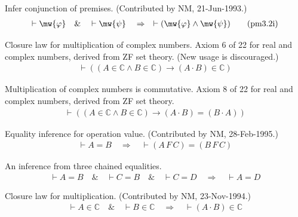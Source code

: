 \begin{lemma} Infer conjunction of premises.  (Contributed
by NM, 21-Jun-1993.)
\begin{align}
\vdash \mw{\varphi}\quad\&\quad \vdash \mw{\psi}\quad\Rightarrow\quad \vdash (
    \mw{\varphi} \wedge \mw{\psi} )\label{eq:pm3.2i}\tag{pm3.2i}
\end{align}
\end{lemma}


\begin{lemma} Closure law for multiplication of complex
numbers.  Axiom 6 of 22 for
       real and complex numbers, derived from ZF set theory.  
       (New usage is discouraged.)
\begin{align}
\vdash ( ( A \in \mathbb{C} \wedge B \in \mathbb{C} ) \rightarrow ( A \cdot B )
    \in \mathbb{C} )\label{eq:axmulcl}\tag{axmulcl}
\end{align}
\end{lemma}


\begin{lemma} Multiplication of complex numbers is
commutative.  Axiom 8 of 22 for
       real and complex numbers, derived from ZF set theory.  
\begin{align}
\vdash ( ( A \in \mathbb{C} \wedge B \in \mathbb{C} ) \rightarrow ( A \cdot B )
    = ( B \cdot A ) )\label{eq:axmulcom}\tag{axmulcom}
\end{align}
\end{lemma}


\begin{lemma} Equality inference for operation value. 
(Contributed by NM,
       28-Feb-1995.)
\begin{align}
\vdash A = B\quad\Rightarrow\quad \vdash ( A \,F \,C ) = ( B \,F \,C
    )\label{eq:oveq1i}\tag{oveq1i}
\end{align}
\end{lemma}


\begin{lemma} An inference from three chained equalities.
\begin{align}
\vdash A = B\quad\&\quad \vdash C = B\quad\&\quad \vdash C =
    D\quad\Rightarrow\quad \vdash A = D\label{eq:3eqtr2i}\tag{3eqtr2i}
\end{align}
\end{lemma}



\begin{lemma} Closure law for multiplication. 
(Contributed by NM, 23-Nov-1994.)
\begin{align}
\vdash A \in \mathbb{C}\quad\&\quad \vdash B \in
    \mathbb{C}\quad\Rightarrow\quad \vdash ( A \cdot B ) \in
    \mathbb{C}\label{eq:mulcli}\tag{mulcli}
\end{align}
\end{lemma}



